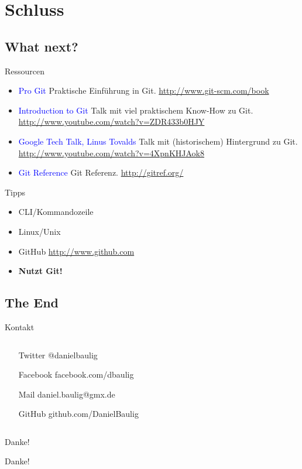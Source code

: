\section{Schluss}
\subsection{What next?}

\begin{frame}{Ressourcen}
    \begin{itemize}[<+->]
        \item \textcolor{blue}{Pro Git} Praktische Einführung in Git. \url{http://www.git-scm.com/book}
        \item \textcolor{blue}{Introduction to Git} Talk mit viel praktischem Know-How zu Git. \url{http://www.youtube.com/watch?v=ZDR433b0HJY}
        \item \textcolor{blue}{Google Tech Talk, Linus Tovalds} Talk mit (historischem) Hintergrund zu Git. \url{http://www.youtube.com/watch?v=4XpnKHJAok8}
        \item \textcolor{blue}{Git Reference} Git Referenz. \url{http://gitref.org/}
    \end{itemize}
\end{frame}

\begin{frame}{Tipps}
    \begin{itemize}[<+->]
        \item CLI/Kommandozeile
        \item Linux/Unix
        \item GitHub \url{http://www.github.com}
        \item \textbf{Nutzt Git!}
    \end{itemize}
\end{frame}

\subsection{The End}

\begin{frame}{Kontakt}
    \begin{columns}
        \begin{column}{.8\textwidth}
            \begin{itemize}[<+->]
                \item [Twitter] @danielbaulig
                \item [Facebook] facebook.com/dbaulig
                \item [Mail] daniel.baulig@gmx.de
                \item [GitHub] github.com/DanielBaulig
            \end{itemize}
        \end{column}
    \end{columns}
\end{frame}

\begin{frame}{Danke!}
    \centerline{\Huge{Danke!}}
\end{frame}


